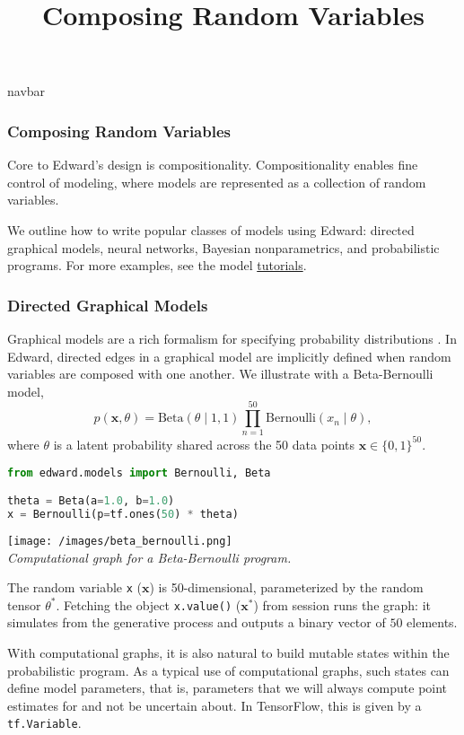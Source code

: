 \title{Composing Random Variables}

{{navbar}}

\subsubsection{Composing Random Variables}

Core to Edward’s design is compositionality. Compositionality enables
fine control of modeling, where models are represented as a collection
of random variables.

We outline how to write popular classes of models using Edward:
directed graphical models, neural networks, Bayesian nonparametrics,
and probabilistic programs. For more examples, see the model
\href{/tutorials/}{tutorials}.

\subsubsection{Directed Graphical Models}

Graphical models are a rich formalism for specifying probability
distributions \citep{koller2009probabilistic}.
In Edward, directed edges in a graphical model are implicitly defined
when random variables are composed with one another. We illustrate
with a Beta-Bernoulli model,
\begin{equation*}
p(\mathbf{x}, \theta) =
\text{Beta}(\theta\mid 1, 1)
\prod_{n=1}^{50} \text{Bernoulli}(x_n\mid \theta),
\end{equation*}
where $\theta$ is a latent probability shared across the 50 data
points $\mathbf{x}\in\{0,1\}^{50}$.

\begin{lstlisting}[language=python]
from edward.models import Bernoulli, Beta

theta = Beta(a=1.0, b=1.0)
x = Bernoulli(p=tf.ones(50) * theta)
\end{lstlisting}

\texttt{[image: /images/beta\_bernoulli.png]} \\
{\small\textit{%
Computational graph for a Beta-Bernoulli program.
}}

The random variable \texttt{x} ($\mathbf{x}$) is 50-dimensional,
parameterized by the random tensor $\theta^*$. Fetching the object
\texttt{x.value()} ($\mathbf{x}^*$) from session runs the graph: it simulates from
the generative process and outputs a binary vector of $50$ elements.

With computational graphs, it is also natural to build mutable states
within the probabilistic program. As a typical use of computational
graphs, such states can define model parameters, that is, parameters
that we will always compute point estimates for and not be uncertain
about. In TensorFlow, this is given by a \texttt{tf.Variable}.

